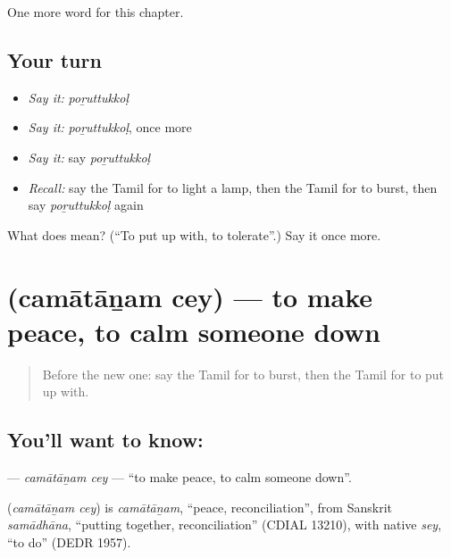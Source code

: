 \begin{grammarlens}[title={What you've built}]
One more word for this chapter.
\end{grammarlens}

\subsection*{Your turn}
\begin{itemize}
\raggedright
  \item \emph{Say it:} \emph{poṟuttukkoḷ}
  \item \emph{Say it:} \emph{poṟuttukkoḷ}, once more
  \item \emph{Say it:} say \emph{poṟuttukkoḷ}
  \item \emph{Recall:} say the Tamil for to light a lamp, then the Tamil for to burst, then say \emph{poṟuttukkoḷ} again
\end{itemize}

\begin{tcolorbox}[breakable,colback=teal!4,colframe=teal!35!black,title={Before you move on}]
What does  mean? (\textquotedblleft{}To put up with, to tolerate\textquotedblright{}.) Say it once more.
\end{tcolorbox}
\section[\texorpdfstring{\ta{சமாதானம்} \ta{செய்} (camātāṉam cey)}{சமாதானம் செய் (camātāṉam cey)}]{  (camātāṉam cey) — to make peace, to calm someone down}

\label{lesson:TA-C166-camatanam-cey}



\begin{quote}
Before the new one: say the Tamil for to burst, then the Tamil for to put up with.
\end{quote}

\subsection*{You'll want to know:  }
\textbf{ } — \emph{camātāṉam cey} — \textquotedblleft{}to make peace, to calm someone down\textquotedblright{}.

\begin{cousinweb}
\textbf{ } (\emph{camātāṉam cey}) is \emph{camātāṉam}, \textquotedblleft{}peace, reconciliation\textquotedblright{}, from Sanskrit \emph{samādhāna}, \textquotedblleft{}putting together, reconciliation\textquotedblright{} (CDIAL 13210), with native \emph{sey}, \textquotedblleft{}to do\textquotedblright{} (DEDR 1957).
\end{cousinweb}


